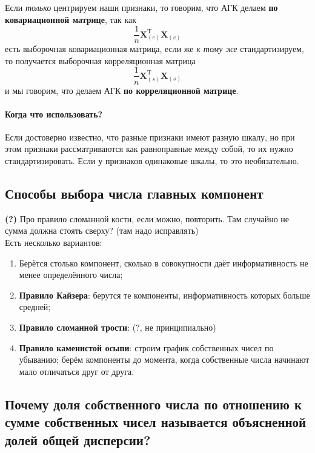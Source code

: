 \documentclass[12pt,a4paper,final]{article}
\begin{document}
Если \textit{только} центрируем наши признаки, то говорим, что АГК делаем \textbf{по ковариационной матрице}, так как 
$$
\frac{1}{n} \bm X^\mathrm{T}_{(c)} \bm X_{(c)}
$$
есть выборочная ковариационная матрица,
если же \textit{к тому же} стандартизируем, то получается выборочная корреляционная матрица
$$
\frac{1}{n} \bm X^\mathrm{T}_{(s)} \bm X_{(s)}
$$
и мы говорим, что делаем АГК \textbf{по корреляционной матрице}.

\paragraph{Когда что использовать?} Если достоверно известно, что разные признаки имеют разную шкалу, но при этом признаки рассматриваются как равноправные между собой, то их нужно стандартизировать. Если у признаков одинаковые шкалы, то это необязательно.

\subsection{Способы выбора числа главных компонент}
\textbf{(?)} Про правило сломанной кости, если можно, повторить. Там случайно не сумма должна стоять сверху? (там надо исправлять)
\\

Есть несколько вариантов:

\begin{enumerate}
\item Берётся столько компонент, сколько в совокупности даёт информативность не менее определённого числа;
\item \textbf{Правило Кайзера}: берутся те компоненты, информативность которых больше средней;
\item \textbf{Правило сломанной трости}: (?, не принципиально)
\item \textbf{Правило каменистой осыпи}: строим график собственных чисел по убыванию; берём компоненты до момента, когда собственные числа начинают мало отличаться друг от друга.
\end{enumerate}


\subsection{Почему доля собственного числа по отношению к сумме собственных чисел называется объясненной долей общей дисперсии?}
\end{document}
